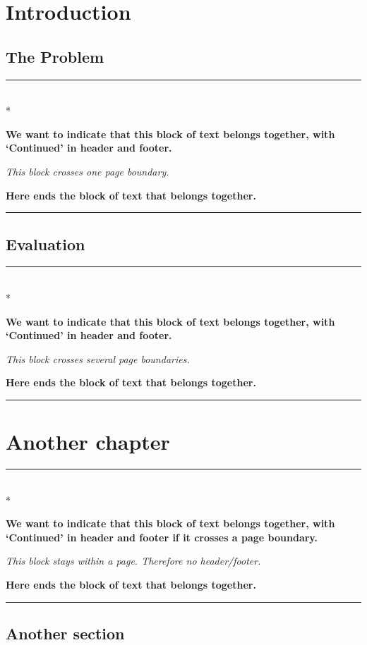 \documentclass{report}
\newenvironment{continued}{%
  \par\noindent\rule{\textwidth}{1mm}\\*
}{
   \noindent\rule{\textwidth}{1mm}%
 }
\begin{document}
\newpage
{}
\chapter{Introduction}

\lipsum[1-4]

\section{The Problem}
\label{sec:problem}

\begin{continued}
  \textbf{We want to indicate that this block of text belongs together, with
    `Continued' in header and footer.}

  \textit{This block crosses one page boundary.}

  \lipsum[2] %

  \textbf{Here ends the  block of text that belongs together.}\\
\end{continued}

\section{Evaluation}

\lipsum[3]

\begin{continued}
  \textbf{We want to indicate that this block of text belongs together, with
    `Continued' in header and footer.}

  \textit{This block crosses several page boundaries.}

  \lipsum[2-7]

  \textbf{Here ends the  block of text that belongs together.}\\
\end{continued}

\chapter{Another chapter}

\label{cha:another-chapter}

\lipsum[2]

\begin{continued}
  \textbf{We want to indicate that this block of text belongs together, with
    `Continued' in header and footer if it crosses a page boundary.}

  \textit{This block stays within a page. Therefore no header/footer.}

  \textbf{Here ends the  block of text that belongs together.}\\
\end{continued}

\section{Another section}

\lipsum[3-4]
\end{document}
